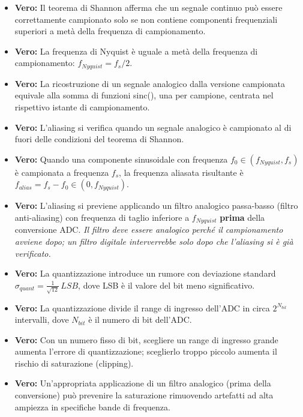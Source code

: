 \begin{itemize}
    \item \textbf{Vero:} Il teorema di Shannon afferma che un segnale continuo può essere correttamente campionato solo se non contiene componenti frequenziali superiori a metà della frequenza di campionamento.
    
    \item \textbf{Vero:} La frequenza di Nyquist è uguale a metà della frequenza di campionamento: $f_{Nyquist} = f_s / 2$.
    
    \item \textbf{Vero:} La ricostruzione di un segnale analogico dalla versione campionata equivale alla somma di funzioni sinc(), una per campione, centrata nel rispettivo istante di campionamento.
    
    \item \textbf{Vero:} L'aliasing si verifica quando un segnale analogico è campionato al di fuori delle condizioni del teorema di Shannon.
    
    \item \textbf{Vero:} Quando una componente sinusoidale con frequenza $f_0 \in (f_{Nyquist}, f_s)$ è campionata a frequenza $f_s$, la frequenza aliasata risultante è $f_{alias} = f_s - f_0 \in (0, f_{Nyquist})$.
    
    \item \textbf{Vero:} L'aliasing si previene applicando un filtro analogico passa-basso (filtro anti-aliasing) con frequenza di taglio inferiore a $f_{Nyquist}$ \textbf{prima} della conversione ADC.
    \textit{Il filtro deve essere analogico perché il campionamento avviene dopo; un filtro digitale interverrebbe solo dopo che l'aliasing si è già verificato.}
    
    \item \textbf{Vero:} La quantizzazione introduce un rumore con deviazione standard $\sigma_{quant} = \frac{1}{\sqrt{12}}\,LSB$, dove LSB è il valore del bit meno significativo.
    
    \item \textbf{Vero:} La quantizzazione divide il range di ingresso dell'ADC in circa $2^{N_{bit}}$ intervalli, dove $N_{bit}$ è il numero di bit dell'ADC.
    
    \item \textbf{Vero:} Con un numero fisso di bit, scegliere un range di ingresso grande aumenta l'errore di quantizzazione; sceglierlo troppo piccolo aumenta il rischio di saturazione (clipping).
    
    \item \textbf{Vero:} Un'appropriata applicazione di un filtro analogico (prima della conversione) può prevenire la saturazione rimuovendo artefatti ad alta ampiezza in specifiche bande di frequenza.
\end{itemize}

